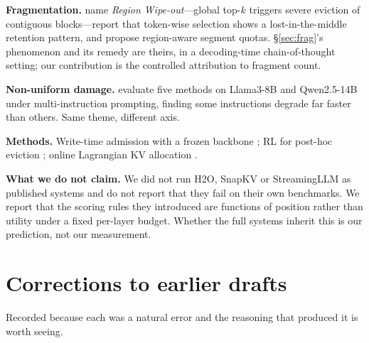 \documentclass[10pt]{article}
\begin{document}
\textbf{Fragmentation.} \citet{yang2026ams} name \emph{Region Wipe-out}---global
top-$k$ triggers severe eviction of contiguous blocks---report that token-wise
selection shows a lost-in-the-middle retention pattern, and propose
region-aware segment quotas. \S\ref{sec:frag}'s phenomenon and its remedy are
theirs, in a decoding-time chain-of-thought setting; our contribution is the
controlled attribution to fragment count.

\textbf{Non-uniform damage.} \citet{chen2025pitfalls} evaluate five methods on
Llama3-8B and Qwen2.5-14B under multi-instruction prompting, finding some
instructions degrade far faster than others. Same theme, different axis.

\textbf{Methods.} Write-time admission with a frozen backbone \citep{kvadmission2025};
RL for post-hoc eviction \citep{learningtoevict2026}; online Lagrangian KV
allocation \citep{triroute2026}.

\textbf{What we do not claim.} We did not run H2O, SnapKV or StreamingLLM as
published systems and do not report that they fail on their own benchmarks. We
report that the scoring rules they introduced are functions of position rather
than utility under a fixed per-layer budget. Whether the full systems inherit
this is our prediction, not our measurement.

\appendix
\section{Corrections to earlier drafts}

Recorded because each was a natural error and the reasoning that produced it is
worth seeing.
\end{document}

